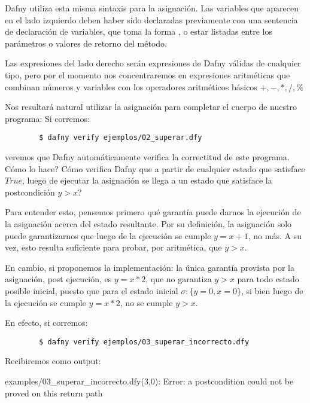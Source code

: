 \documentclass[12pt, a4paper, openany, fleqn]{book}
\begin{document}
    Dafny utiliza esta misma sintaxis para la asignación. Las variables que aparecen en el lado izquierdo deben haber sido declaradas previamente con una sentencia de declaración de variables, que toma la forma , o estar listadas entre los parámetros o valores de retorno del método.

    Las expresiones del lado derecho serán expresiones de Dafny válidas de cualquier tipo, pero por el momento nos concentraremos en expresiones aritméticas que combinan números y variables con los operadores aritméticos básicos $+,-,*,/,\%$

    Nos resultará natural utilizar la asignación para completar el cuerpo de nuestro programa:
    Si corremos:
    \begin{verbatim}
        $ dafny verify ejemplos/02_superar.dfy
    \end{verbatim}
    veremos que Dafny automáticamente verifica la correctitud de este programa. Cómo lo hace? Cómo verifica Dafny que a partir de cualquier estado que satisface $True$, luego de ejecutar la asignación  se llega a un estado que satisface la postcondición $y > x$?

    Para entender esto, pensemos primero qué garantía puede darnos la ejecución de la asignación acerca del estado resultante. Por su definición, la asignación solo puede garantizarnos que luego de la ejecución se cumple $y = x + 1$, no más. A su vez, esto resulta suficiente para probar, por aritmética, que $y > x$.

    En cambio, si proponemos la implementación:
    la única garantía provista por la asignación, post ejecución, es $y = x * 2$, que no garantiza $y > x$ para todo estado posible inicial, puesto que para el estado inicial $\sigma:\{y=0,x=0\}$, si bien luego de la ejecución se cumple $y = x * 2 $, no se cumple $y > x$.

    En efecto, si corremos:
    \begin{verbatim}
        $ dafny verify ejemplos/03_superar_incorrecto.dfy
    \end{verbatim}
    Recibiremos como output:
    \begin{spverbatim}
    examples/03_superar_incorrecto.dfy(3,0): Error: a postcondition could not be proved on this return path
    \end{spverbatim}
\end{document}
